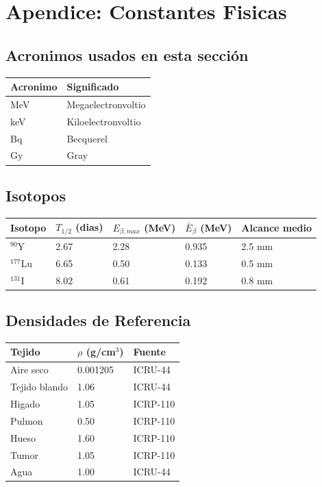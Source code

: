 \documentclass[12pt,a4paper]{article}
\begin{document}
\section*{Apendice: Constantes Fisicas}

\subsection*{Acronimos usados en esta sección}
\begin{tabular}{ll}
\toprule
\textbf{Acronimo} & \textbf{Significado} \\
\midrule
MeV & Megaelectronvoltio \\
keV & Kiloelectronvoltio \\
Bq & Becquerel \\
Gy & Gray \\
\bottomrule
\end{tabular}

\subsection{Isotopos}

\begin{center}
\begin{tabular}{lllll}
\toprule
\textbf{Isotopo} & $T_{1/2}$ (dias) & $E_{\beta,max}$ (MeV) & $\bar{E}_\beta$ (MeV) & \textbf{Alcance medio} \\
\midrule
$^{90}$Y & 2.67 & 2.28 & 0.935 & 2.5 mm \\
$^{177}$Lu & 6.65 & 0.50 & 0.133 & 0.5 mm \\
$^{131}$I & 8.02 & 0.61 & 0.192 & 0.8 mm \\
\bottomrule
\end{tabular}
\end{center}

\subsection{Densidades de Referencia}

\begin{center}
\begin{tabular}{lll}
\toprule
\textbf{Tejido} & $\rho$ (g/cm$^3$) & \textbf{Fuente} \\
\midrule
Aire seco & 0.001205 & ICRU-44 \\
Tejido blando & 1.06 & ICRU-44 \\
Higado & 1.05 & ICRP-110 \\
Pulmon & 0.50 & ICRP-110 \\
Hueso & 1.60 & ICRP-110 \\
Tumor & 1.05 & ICRP-110 \\
Agua & 1.00 & ICRU-44 \\
\bottomrule
\end{tabular}
\end{center}
\end{document}
